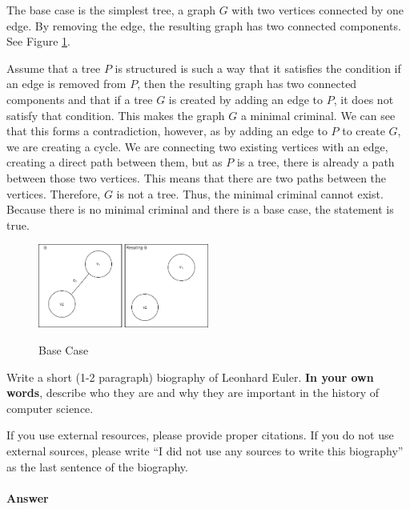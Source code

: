 \documentclass{article}
\begin{document}
	
	The base case is the simplest tree, a graph $G$ with two vertices connected by one edge. By removing the edge, the resulting graph has two connected components. See Figure \ref{graph}.
	
	
	Assume that a tree $P$ is structured is such a way that it satisfies the condition if an edge is removed from $P$, then the resulting graph has 
	two connected components and that if a tree $G$ is created by adding an edge to $P$, it does not satisfy that condition. This makes the graph $G$ a
	minimal criminal. We can see that this forms a contradiction, however, as by adding an edge to $P$ to create $G$, we are creating a cycle. We are 
	connecting two existing vertices with an edge, creating a direct path between them, but as $P$ is a tree, there is already a path between those two vertices.
	This means that there are two paths between the vertices. Therefore, $G$ is not a tree. Thus, the minimal criminal cannot exist.
	Because there is no minimal criminal and there is a base case, the statement is true.

 \begin{figure}
\caption{Base Case}
\centering
\includegraphics[width=0.5\textwidth]{images/graphBaseCase}
\label{graph}
\end{figure}

\collab{\todo{}}

Write a short (1-2 paragraph) biography of Leonhard Euler.
\textbf{In your own words}, describe who they are and why they are important in
the history of computer science.

If you use external resources, please provide
proper citations. If you do not use external sources, please write ``I did not
use any sources to write this biography'' as the last sentence of the
biography.

\paragraph{Answer}


% 
% 
\end{document}
